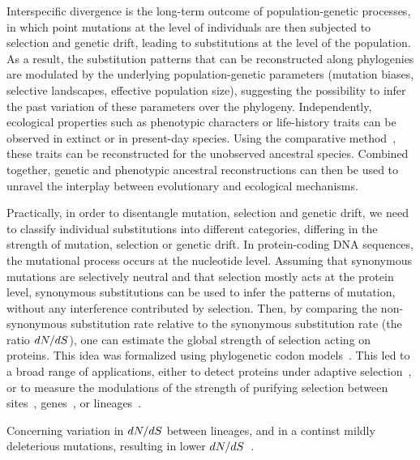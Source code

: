 \documentclass{MBE}
\begin{document}
	Interspecific divergence is the long-term outcome of population-genetic processes, in which point mutations at the level of individuals are then subjected to selection and {genetic drift}, leading to substitutions at the level of the population.
	As a result, the {substitution} patterns that can be reconstructed along phylogenies are modulated by the underlying population-genetic parameters (mutation biases, selective landscapes, effective population size), suggesting the possibility to infer the past variation of these parameters over the phylogeny.
	Independently, ecological properties such as phenotypic characters or life-history traits can be observed in extinct or in present-day species.
	Using the comparative method~\citep{Felsenstein1985}, these traits can be reconstructed for the unobserved ancestral species.
	Combined together, genetic and phenotypic ancestral reconstructions can then be used to unravel the interplay between evolutionary and ecological mechanisms.

	Practically, in order to disentangle mutation, selection and {genetic drift}, we need to classify individual substitutions into different categories, differing in the strength of mutation, selection or {genetic drift}.
	In protein-coding {DNA} sequences, the mutational process occurs at the nucleotide level.
	Assuming that {synonymous} mutations are selectively {neutral} and that selection mostly acts at the protein level, {synonymous} substitutions can be used to infer the patterns of mutation, without any interference contributed by selection.
	Then, by comparing the {non-synonymous} {substitution} rate relative to the {synonymous} {substitution} rate (the ratio $dN/dS$), one can estimate the global strength of selection acting on proteins.
	This idea was formalized using phylogenetic {codon} models~\citep{Muse1994,Goldman1994}.
	This led to a broad range of applications, either to detect proteins under adaptive selection~\citep{Kosiol2008}, or to measure the modulations of the strength of purifying selection between sites~\citep{Echave2016}, genes~\citep{Zhang2015}, or lineages~\citep{Lartillot2011}.

	Concerning variation in $dN/dS$ between lineages, and in a continst mildly deleterious mutations, resulting in lower $dN/dS$~\citep{Kimura1979, Welch2008}.
\end{document}
